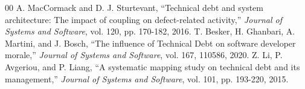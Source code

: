 \documentclass[conference]{IEEEtran}
\begin{document}
\begin{thebibliography}{00}
 A. MacCormack and D. J. Sturtevant, ``Technical debt and system architecture: The impact of coupling on defect-related activity,'' \textit{Journal of Systems and Software}, vol. 120, pp. 170-182, 2016.
 T. Besker, H. Ghanbari, A. Martini, and J. Bosch, ``The influence of Technical Debt on software developer morale,'' \textit{Journal of Systems and Software}, vol. 167, 110586, 2020.
 Z. Li, P. Avgeriou, and P. Liang, ``A systematic mapping study on technical debt and its management,'' \textit{Journal of Systems and Software}, vol. 101, pp. 193-220, 2015.

\end{thebibliography}
\end{document}
